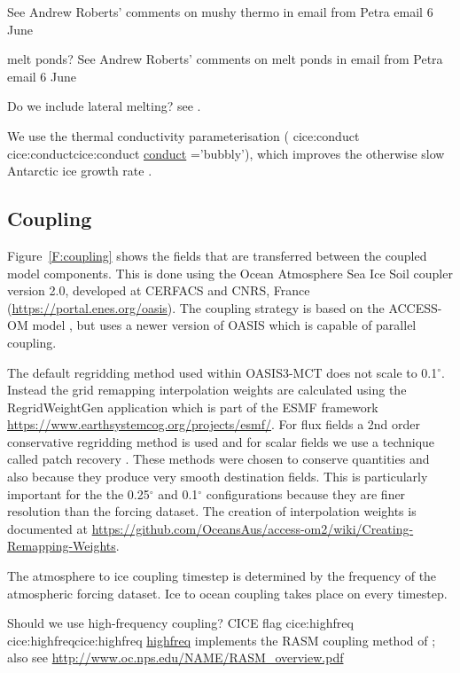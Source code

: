 \documentclass[11pt]{article}
\makeatletter
\newcommand*{\make@hex@label}[1]{%
  \def\hex@label{#1}%
  \@onelevel@sanitize\hex@label
  \EdefEscapeHex\hex@label{\hex@label}%
}
\newcommand*{\hexhyperlink}[2]{%
  \make@hex@label{#1}%
  \hyperlink{\hex@label}{#2}%
}
\newcommand{\cicelink}[2]{\hexhyperlink{cice:#2}{#1}}
\newcommand{\param}[1]{\textsf{#1}}
\newcommand{\cice}[1]{\param{\cicelink{#1}{#1}}}
\makeatother
\begin{document}
See Andrew Roberts' comments on mushy thermo in email from Petra email 6 June

melt ponds?
See Andrew Roberts' comments on melt ponds in email from Petra email 6 June

Do we include lateral melting? see \cite{RoachDeanRenwick2018a}.

We use the \citet{PringleEickenTrodahlBackstrom2007a} thermal conductivity parameterisation (\cice{conduct}='bubbly'), which improves the otherwise slow Antarctic ice growth rate \citep{Hunke2010a}.

\subsection{Coupling}

Figure~\ref{F:coupling} shows the fields that are transferred between the coupled model components.
This is done using the Ocean Atmosphere Sea Ice Soil \citep[OASIS3-MCT, ][]{ValckeCraigCoquart2015a} coupler version 2.0, developed at CERFACS and CNRS, France (\url{https://portal.enes.org/oasis}). The coupling strategy is based on the ACCESS-OM model \citep{BiMarsland2010a}, but uses a newer version of OASIS which is capable of parallel coupling.

The default regridding method used within OASIS3-MCT does not scale to 0.1$^\circ$. Instead the grid remapping interpolation weights are calculated using the RegridWeightGen application which is part of the ESMF framework \url{https://www.earthsystemcog.org/projects/esmf/}. For flux fields a 2nd order conservative regridding method is used and for scalar fields we use a technique called patch recovery \citep{Kritsikis2017} \citep{Khoei2007}. These methods were chosen to conserve quantities and also because they produce very smooth destination fields. This is particularly important for the the 0.25$^\circ$ and 0.1$^\circ$ configurations because they are finer resolution than the forcing dataset. The creation of interpolation weights is documented at \url{https://github.com/OceansAus/access-om2/wiki/Creating-Remapping-Weights}.

The atmosphere to ice coupling timestep is determined by the frequency of the atmospheric forcing dataset. Ice to ocean coupling takes place on every timestep.

Should we use high-frequency coupling? CICE flag \cice{highfreq} implements the RASM coupling method of \citet{RobertsCraigMaslowskiOsinskiDuvivierHughesNijssenCassanoBrunke2015a, RobertsMaslowskiJakackiHigginsCraigCassanoGutowskiLettenmaier2011a}; also see \url{http://www.oc.nps.edu/NAME/RASM_overview.pdf}
\end{document}
